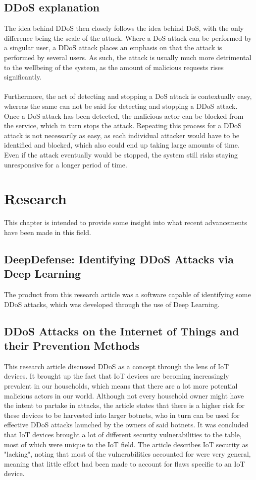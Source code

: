\documentclass[a4paper, titlepage,12pt]{article}
\begin{document}
	\subsection{DDoS explanation}
		The idea behind DDoS then closely follows the idea behind DoS, with the only difference being the scale of the attack. Where a DoS attack can be performed by a singular user, a DDoS attack places an emphasis on that the attack is performed by several users. As such, the attack is usually much more detrimental to the wellbeing of the system, as the amount of malicious requests rises significantly. 
\\\\
		Furthermore, the act of detecting and stopping a DoS attack is contextually easy, whereas the same can not be said for detecting and stopping a DDoS attack. Once a DoS attack has been detected, the malicious actor can be blocked from the service, which in turn stops the attack. Repeating this process for a DDoS attack is not necessarily as easy, as each individual attacker would have to be identified and blocked, which also could end up taking large amounts of time. Even if the attack eventually would be stopped, the system still risks staying unresponsive for a longer period of time.
	\section{Research}
		This chapter is intended to provide some insight into what recent advancements have been made in this field.
	\subsection{DeepDefense: Identifying DDoS Attacks via Deep Learning
}
		The product from this research article was a software capable of identifying some DDoS attacks, which was developed through the use of Deep Learning. \cite{7946998}
	\subsection{DDoS Attacks on the Internet of Things and their Prevention Methods}
		This research article discussed DDoS as a concept through the lens of IoT devices. It brought up the fact that IoT devices are becoming increasingly prevalent in our households, which means that there are a lot more potential malicious actors in our world. Although not every household owner might have the intent to partake in attacks, the article states that there is a higher risk for these devices to be harvested into larger botnets, who in turn can be used for effective DDoS attacks launched by the owners of said botnets. It was concluded that IoT devices brought a lot of different security vulnerabilities to the table, most of which were unique to the IoT field. The article describes IoT security as "lacking", noting that most of the vulnerabilities accounted for were very general, meaning that little effort had been made to account for flaws specific to an IoT device. \cite{10.1145/3231053.3231057}
	\printbibliography
\end{document}
